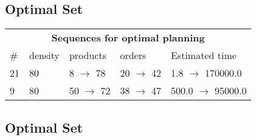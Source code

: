 \documentclass{article}
\begin{document}
                            \subsection*{Optimal Set}

                            \begin{center}
                            \begin{tabular}{l|l|l|l|l}
                            \multicolumn{5}{c}{\bf \large Sequences for optimal planning}\\
                            \# & density & products & orders & Estimated time\\\midrule
                            21&80&8 $\rightarrow$ 78&20 $\rightarrow$ 42&1.8 $\rightarrow$ 170000.0\\
9&80&50 $\rightarrow$ 72&38 $\rightarrow$ 47&500.0 $\rightarrow$ 95000.0
                            \end{tabular}
                            \end{center}
                    
                                \subsection*{Optimal Set}
                                
\end{document}
